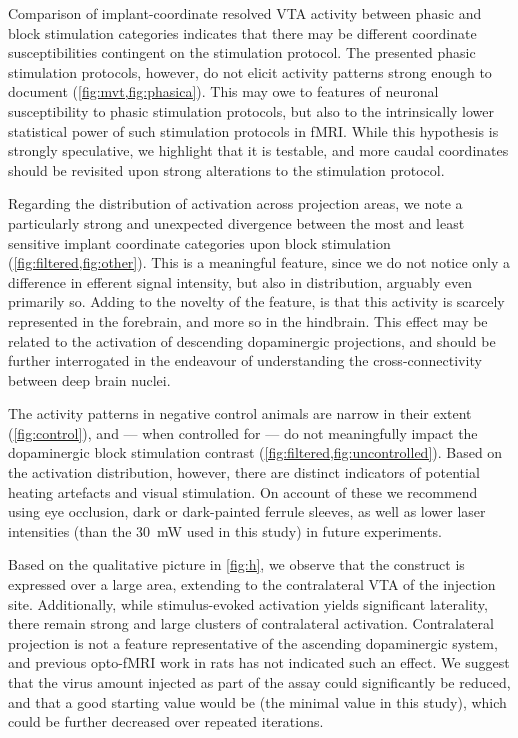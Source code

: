 Comparison of implant-coordinate resolved VTA activity between phasic and block stimulation categories indicates that there may be different coordinate susceptibilities contingent on the stimulation protocol.
The presented phasic stimulation protocols, however, do not elicit activity patterns strong enough to document (\cref{fig:mvt,fig:phasica}).
This may owe to features of neuronal susceptibility to phasic stimulation protocols, but also to the intrinsically lower statistical power of such stimulation protocols in fMRI.
While this hypothesis is strongly speculative, we highlight that it is testable, and more caudal coordinates should be revisited upon strong alterations to the stimulation protocol.

Regarding the distribution of activation across projection areas, we note a particularly strong and unexpected divergence between the most and least sensitive implant coordinate categories upon block stimulation (\cref{fig:filtered,fig:other}).
This is a meaningful feature, since we do not notice only a difference in efferent signal intensity, but also in distribution, arguably even primarily so.
Adding to the novelty of the feature, is that this activity is scarcely represented in the forebrain, and more so in the hindbrain.
This effect may be related to the activation of descending dopaminergic projections, and should be further interrogated in the endeavour of understanding the cross-connectivity between deep brain nuclei.

The activity patterns in negative control animals are narrow in their extent (\cref{fig:control}), and --- when controlled for --- do not meaningfully impact the dopaminergic block stimulation contrast (\cref{fig:filtered,fig:uncontrolled}).
Based on the activation distribution, however, there are distinct indicators of potential heating artefacts and visual stimulation.
On account of these we recommend using eye occlusion, dark or dark-painted ferrule sleeves, as well as lower laser intensities (than the \SI{30}{\milli\watt} used in this study) in future experiments.

Based on the qualitative picture in \cref{fig:h}, we observe that the construct is expressed over a large area, extending to the contralateral VTA of the injection site.
Additionally, while stimulus-evoked activation yields significant laterality, there remain strong and large clusters of contralateral activation.
Contralateral projection is not a feature representative of the ascending dopaminergic system, and previous opto-fMRI work in rats \cite{Lohani2016} has not indicated such an effect.
We suggest that the virus amount injected as part of the assay could significantly be reduced, and that a good starting value would be
 (the minimal value in this study),
which could be further decreased over repeated iterations.


